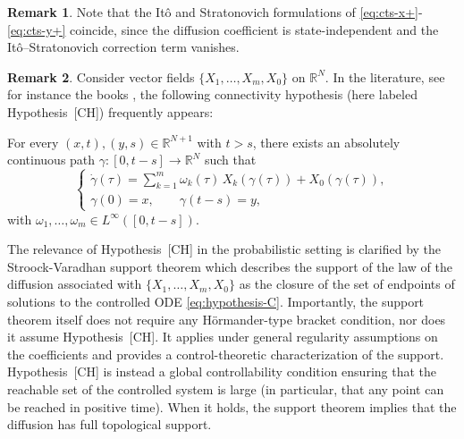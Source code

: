 \documentclass[11pt, a4paper,leqno]{amsart}
\theoremstyle{definition}
\newtheorem{remark}{Remark}[section]
\numberwithin{equation}{section}
\begin{document}
\begin{remark}
Note that the Itô and Stratonovich formulations of \eqref{eq:cts-x+}-\eqref{eq:cts-y+} coincide, since the diffusion coefficient is state-independent and the Itô–Stratonovich correction term vanishes.
\end{remark}

\begin{remark}\label{thm:supportrem}
Consider vector fields $\{X_1,\dots,X_m,X_0\}$ on $\mathbb{R}^N$.
In the literature, see for instance the books \cite{AgrachevSachkov2004,Jurdjevic1997}, the following connectivity hypothesis (here labeled Hypothesis~[CH]) frequently appears:


\noindent For every $(x,t),(y,s)\in \mathbb{R}^{N+1}$ with $t>s$, there exists an absolutely continuous path $\gamma : [0,t-s]\to \mathbb{R}^N$
such that
\begin{equation}\label{eq:hypothesis-C}
\begin{cases}
\displaystyle
\dot{\gamma}(\tau)
=
\sum_{k=1}^m \omega_k(\tau)\,X_k(\gamma(\tau))
+
X_0(\gamma(\tau)),
\\[0.5em]
\gamma(0)=x, \qquad \gamma(t-s)=y,
\end{cases}
\end{equation}
with $\omega_1,\dots,\omega_m \in L^\infty([0,t-s])$.

\noindent The relevance of Hypothesis~[CH] in the probabilistic setting is clarified
by the Stroock-Varadhan support theorem which describes the support of the law of the diffusion associated
with $\{X_1,\dots,X_m,X_0\}$ as the closure of the set of endpoints of
solutions to the controlled ODE \eqref{eq:hypothesis-C}. Importantly, the support theorem itself does not require any Hörmander-type
bracket condition, nor does it assume Hypothesis~[CH].
It applies under general regularity assumptions on the coefficients and
provides a control-theoretic characterization of the support. Hypothesis~[CH] is instead a global controllability condition ensuring that
the reachable set of the controlled system is large (in particular, that any
point can be reached in positive time).
When it holds, the support theorem implies that the diffusion has full
topological support.
\end{remark}
\end{document}
